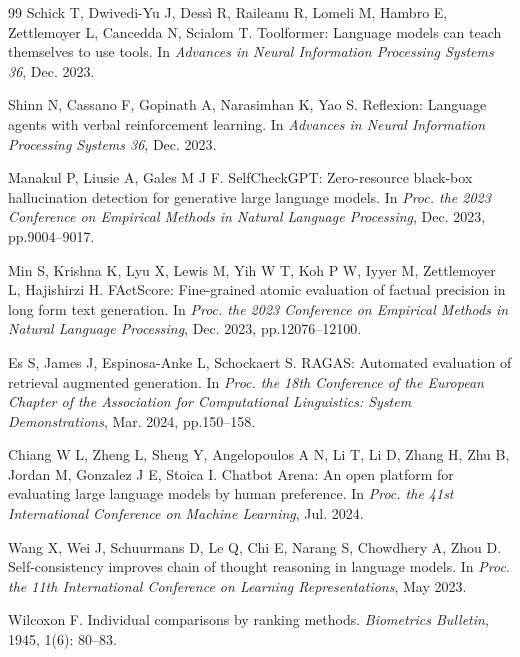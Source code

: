 \documentclass[9pt,twocolumn]{extarticle}
\begin{document}
\begin{thebibliography}{99}
Schick T, Dwivedi-Yu J, Dess\`i R, Raileanu R, Lomeli M, Hambro E, Zettlemoyer
L, Cancedda N, Scialom T. Toolformer: Language models can teach themselves to
use tools. In \textit{Advances in Neural Information Processing Systems 36},
Dec. 2023.

Shinn N, Cassano F, Gopinath A, Narasimhan K, Yao S. Reflexion: Language agents
with verbal reinforcement learning. In \textit{Advances in Neural Information
Processing Systems 36}, Dec. 2023.

Manakul P, Liusie A, Gales M J F. SelfCheckGPT: Zero-resource black-box
hallucination detection for generative large language models. In \textit{Proc.
the 2023 Conference on Empirical Methods in Natural Language Processing},
Dec. 2023, pp.9004--9017.

Min S, Krishna K, Lyu X, Lewis M, Yih W T, Koh P W, Iyyer M, Zettlemoyer L,
Hajishirzi H. FActScore: Fine-grained atomic evaluation of factual precision in
long form text generation. In \textit{Proc. the 2023 Conference on Empirical
Methods in Natural Language Processing}, Dec. 2023, pp.12076--12100.

Es S, James J, Espinosa-Anke L, Schockaert S. RAGAS: Automated evaluation of
retrieval augmented generation. In \textit{Proc. the 18th Conference of the
European Chapter of the Association for Computational Linguistics: System
Demonstrations}, Mar. 2024, pp.150--158.

Chiang W L, Zheng L, Sheng Y, Angelopoulos A N, Li T, Li D, Zhang H, Zhu B,
Jordan M, Gonzalez J E, Stoica I. Chatbot Arena: An open platform for
evaluating large language models by human preference. In \textit{Proc. the 41st
International Conference on Machine Learning}, Jul. 2024.

Wang X, Wei J, Schuurmans D, Le Q, Chi E, Narang S, Chowdhery A, Zhou D.
Self-consistency improves chain of thought reasoning in language models. In
\textit{Proc. the 11th International Conference on Learning Representations},
May 2023.

Wilcoxon F. Individual comparisons by ranking methods. \textit{Biometrics
Bulletin}, 1945, 1(6): 80--83.
\end{thebibliography}

\end{document}
